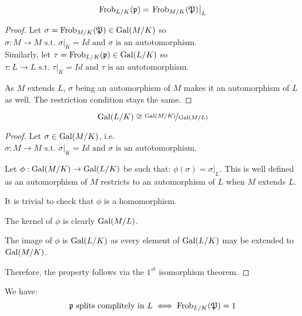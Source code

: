 \begin{property}
	$$
	\text{Frob}_{L/K}(\mathfrak{p}) = \left. \text{Frob}_{M/K}(\mathfrak{P}) \right|_L
	$$
\end{property}
\begin{proof}
	Let $\sigma = \text{Frob}_{M/K}(\mathfrak{P}) \in \text{Gal}(M/K)$ so 
	$\sigma: M \to M \text{ s.t. } \left. \sigma \right|_K = Id \text{ and } \sigma \text{ is an autotomorphism}$.\\
	Similarly, let $\tau = \text{Frob}_{L/K}(\mathfrak{p}) \in \text{Gal}(L/K)$ so 
	$\tau: L \to L \text{ s.t. } \left. \tau \right|_K = Id \text{ and } \tau \text{ is an autotomorphism}$.
	
	As $M$ extends $L$, $\sigma$ being an automorphism of $M$ makes it an automorphism of $L$ as well.
	The restriction condition stays the same.
\end{proof}


\begin{property}
	$$
	\text{Gal}(L/K) \cong \nicefrac{\text{Gal}(M/K)}{\text{Gal}(M/L)}
	$$
\end{property}
\begin{proof}
	Let $\sigma \in \text{Gal}(M/K)$, i.e. $\sigma: M \to M \text{ s.t. } \left. \sigma \right|_K = Id \text{ and } \sigma \text{ is an autotomorphism}$.
	
	Let $\phi: \text{Gal}(M/K) \to \text{Gal}(L/K)$ be such that:
	$\phi(\sigma) = \left. \sigma \right|_L$.
	This is well defined as an automorphism of $M$ restricts to an automorphism of $L$ when $M$ extends $L$.
	
	It is trivial to check that $\phi$ is a homomorphism.
	
	The kernel of $\phi$ is clearly $\text{Gal}(M/L)$.
	
	The image of $\phi$ is $\text{Gal}(L/K)$ as every element of $\text{Gal}(L/K)$ may be extended to $\text{Gal}(M/K)$.
	
	Therefore, the property follows via the $1^{st}$ isomorphism theorem.
\end{proof}

\begin{property}
	We have: 
	$$
	\mathfrak{p} \text{ splits complitely in } L 
	\iff \text{Frob}_{L/K}(\mathfrak{P}) = 1
	$$
\end{property}
\cite[p.100]{AlgebraicNumberFields}


